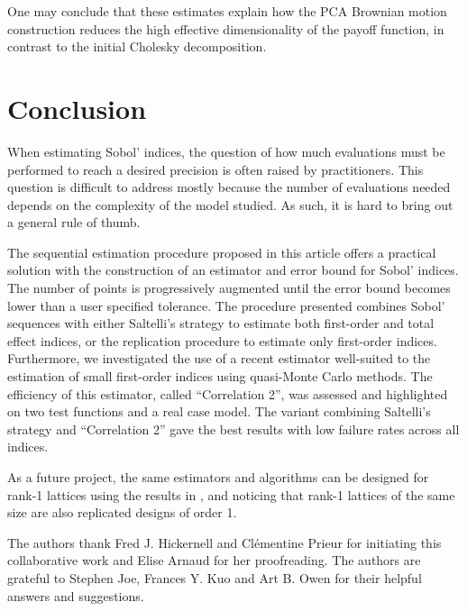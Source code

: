 One may conclude that these estimates explain how the PCA Brownian motion construction reduces the high effective dimensionality of the payoff function, in contrast to the initial Cholesky decomposition.

\section{Conclusion}
When estimating Sobol' indices, the question of how much evaluations must be performed to reach a desired precision is often raised by practitioners. This question is difficult to address mostly because the number of evaluations needed depends on the complexity of the model studied. As such, it is hard to bring out a general rule of thumb. 

The sequential estimation procedure proposed in this article offers a practical solution with the construction of an estimator and error bound for Sobol' indices. The number of points is progressively augmented until the error bound becomes lower than a user specified tolerance. The procedure presented combines Sobol' sequences with either Saltelli's strategy to estimate both first-order and total effect indices, or the replication procedure to estimate only first-order indices. Furthermore, we investigated the use of a recent estimator well-suited to the estimation of small first-order indices using quasi-Monte Carlo methods. The efficiency of this estimator, called ``Correlation 2'', was assessed and highlighted on two test functions and a real case model. The variant combining Saltelli's strategy and ``Correlation 2'' gave the best results with low failure rates across all indices.

As a future project, the same estimators and algorithms can be designed for rank-1 lattices using the results in \cite{JimHic}, and noticing that rank-1 lattices of the same size are also replicated designs of order 1. 

\begin{acknowledgements}
The authors thank Fred J. Hickernell and Cl\'ementine Prieur for initiating this collaborative work and Elise Arnaud for her proofreading. The authors are grateful to Stephen Joe, Frances Y. Kuo and Art B. Owen for their helpful answers and suggestions.   
\end{acknowledgements}


